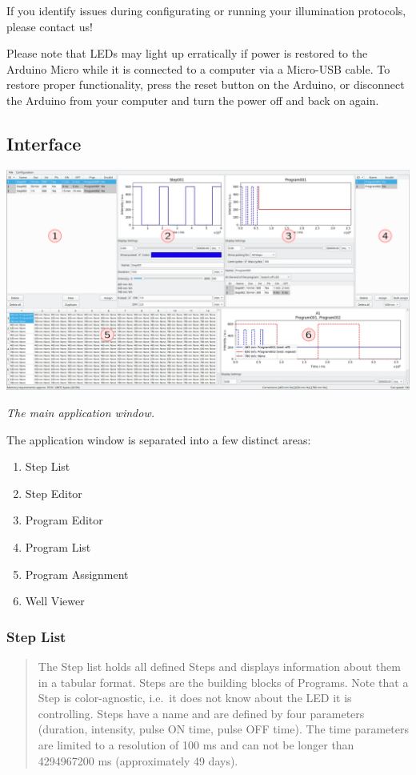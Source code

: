 If you identify issues during configurating or running your illumination
protocols, please contact us!

Please note that LEDs may light up erratically if power is restored to
the Arduino Micro while it is connected to a computer via a Micro-USB
cable. To restore proper functionality, press the reset button on the
Arduino, or disconnect the Arduino from your computer and turn the power
off and back on again.

\hypertarget{interface}{%
\subsection{Interface}\label{interface}}

\includegraphics{images/annotated/overview.jpg}

\emph{The main application window.}

The application window is separated into a few distinct areas:

\begin{enumerate}
\def\labelenumi{\arabic{enumi}.}
\tightlist
\item
  Step List
\item
  Step Editor
\item
  Program Editor
\item
  Program List
\item
  Program Assignment
\item
  Well Viewer
\end{enumerate}

\hypertarget{step-list}{%
\subsubsection{Step List}\label{step-list}}

\begin{quote}
The Step list holds all defined Steps and displays information about
them in a tabular format. Steps are the building blocks of Programs.
Note that a Step is color-agnostic, i.e.~it does not know about the LED
it is controlling. Steps have a name and are defined by four parameters
(duration, intensity, pulse ON time, pulse OFF time). The time
parameters are limited to a resolution of 100 ms and can not be longer
than 4294967200 ms (approximately 49 days).
\end{quote}


